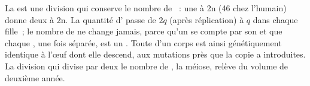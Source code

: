 \begin{proposition}\label{prop:b1:replication-mitosis:conserves}
La  est une division qui conserve le nombre de ~: une
 à 2n  (46 chez l'humain) donne deux  à 2n. La
quantité d' passe de $2q$ (après réplication) à $q$ dans chaque
fille~; le nombre de  ne change jamais, parce qu'un
 se compte par son  et que chaque , une
fois séparée, est un . Toute  d'un corps est ainsi
génétiquement identique à l'œuf dont elle descend, aux mutations près
que la copie a introduites. La division qui divise par deux le nombre de
, la méiose, relève du volume de deuxième année.
\end{proposition}

